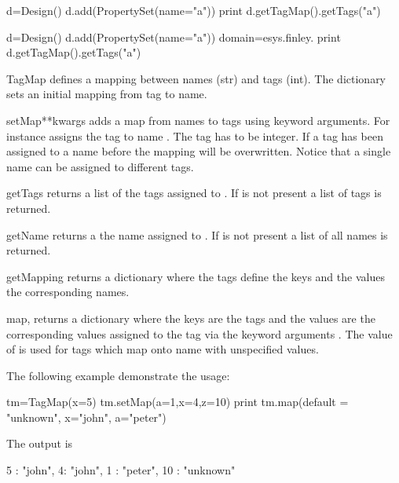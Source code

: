 \begin{python}
d=Design()
d.add(PropertySet(name="a"))
print d.getTagMap().getTags("a")
\end{python}

\begin{python}
d=Design()
d.add(PropertySet(name="a"))
domain=esys.finley.
print d.getTagMap().getTags("a")
\end{python}

\begin{classdesc}{TagMap}{}
defines a mapping between names (str) and tags (int). 
The dictionary  sets an initial mapping from tag to name.
\end{classdesc}

\begin{methoddesc}[TagMap]{setMap}{**kwargs}
adds a map from names to tags using keyword arguments. For instance 
 assigns the tag  to name . The tag has to be integer.
If a tag has been assigned to a name before the mapping will be overwritten. 
Notice that a single name can be assigned to different tags.
\end{methoddesc}

\begin{methoddesc}[TagMap]{getTags}{}
returns a list of the tags assigned to . If  is not present 
a list of tags is returned.
\end{methoddesc}

 \begin{methoddesc}[TagMap]{getName}{}
returns a the name assigned to . If  is not present 
a list of all names is returned.
\end{methoddesc}


\begin{methoddesc}[TagMap]{getMapping}{}
returns a dictionary where the tags define the keys and the values the corresponding names.
\end{methoddesc}

\begin{methoddesc}[TagMap]{map}{, }
returns a dictionary where the keys are the tags and the values are the corresponding values assigned 
to the tag via the keyword arguments . The value of  is used for tags 
which map onto name with unspecified values.

The following example demonstrate the usage:
\begin{python}
tm=TagMap(x=5)
tm.setMap(a=1,x=4,z=10)
print tm.map(default = "unknown", x="john",  a="peter")
\end{python}  
The output is
\begin{python}
{ 5 : "john", 4: "john", 1 : "peter", 10 : "unknown" }
\end{python}  
\end{methoddesc}

